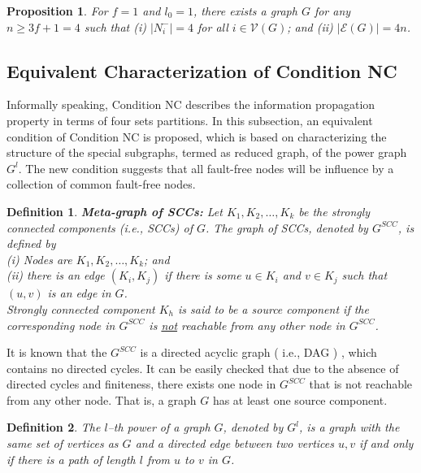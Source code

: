 \documentclass[letterpaper, 11pt]{article}
\newtheorem{definition}{Definition}[section]
\newtheorem{proposition}[theorem]{Proposition}
\newcommand{\calE}{{\mathcal{E}}}
\newcommand{\calV}{{\mathcal{V}}}
\begin{document}
\begin{proposition}
\label{density}
For $f=1$ and $l_0=1$, there exists a graph $G$ for any $n\ge 3f+1=4$ such that
(i) $|N_i^{-}|=4$ for all $i\in \calV(G)$; and
(ii) $|\calE(G)|=4n$.
\end{proposition}






\subsection{Equivalent Characterization of Condition NC}
Informally speaking, Condition NC describes the information propagation property in terms of four sets partitions. In this subsection, an equivalent condition of Condition NC is proposed, which is based on characterizing the structure of the special subgraphs, termed as reduced graph, of the power graph $G^l$. The new condition suggests that all fault-free nodes will be influence by a collection of common fault-free nodes.

\begin{definition}
\label{def:decompose}
{\bf Meta-graph of SCCs:}
Let $K_1,K_2,\ldots,K_k$ be the strongly connected components (i.e., SCCs) of $G$. The graph of SCCs, denoted by $G^{SCC}$, is defined by\\
(i) Nodes are $K_1,K_2,\ldots,K_k$; and\\
(ii) there is an edge $(K_i, K_j)$ if there is some $u\in K_i$ and $v\in K_j$ such that $(u, v)$ is an edge in $G$.\\
Strongly connected component $K_h$ is said to be a {\em source component}
if the corresponding node in $G^{SCC}$ is \underline{not} reachable from any
other node in $G^{SCC}$.
\end{definition}
It is known that the $G^{SCC}$ is a directed acyclic graph ( i.e., DAG ) \cite{dag_decomposition}, which contains no directed cycles. It can be easily checked that due to the absence of directed cycles and finiteness, there exists one node in $G^{SCC}$ that is not reachable from any other node. That is, a graph $G$ has at least one source component.
\begin{definition}
The $l$--th power of a graph $G$, denoted by $G^l$,  is a graph with the same set of vertices as $G$ and a directed edge between two vertices $u, v$ if and only if there is a path of length $l$ from $u$ to $v$ in $G$.
\end{definition}
\end{document}
